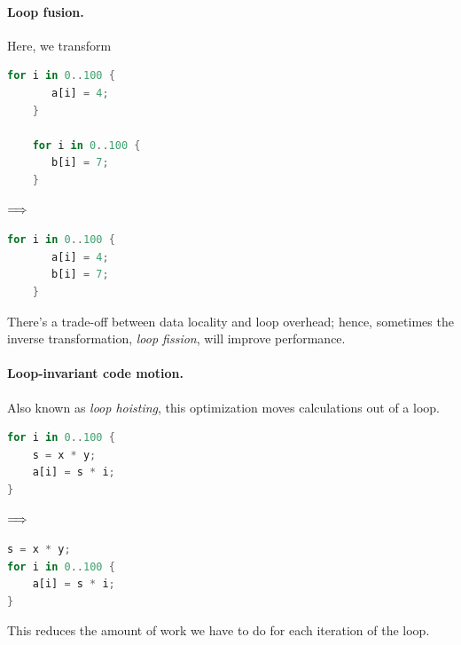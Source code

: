\documentclass[a4paper]{report}
\begin{document}
\paragraph{Loop fusion.} Here, we transform
\begin{center}
\vspace*{-1em}
\begin{minipage}{.3\textwidth}
  \begin{lstlisting}[language=Rust]
    for i in 0..100 {
       a[i] = 4;
    }

    for i in 0..100 {
       b[i] = 7;
    }
  \end{lstlisting}
  \end{minipage} $\Longrightarrow \hspace*{2em}$ \begin{minipage}{.4\textwidth}
  \begin{lstlisting}[language=Rust]
    for i in 0..100 {
       a[i] = 4;
       b[i] = 7;
    }
  \end{lstlisting}
  \end{minipage}
  \end{center}
There's a trade-off between data locality and loop overhead; hence,
sometimes the inverse transformation, \emph{loop fission}, will
improve performance.

\paragraph{Loop-invariant code motion.} Also known as \emph{loop hoisting},
this optimization moves calculations out of a loop. 
\begin{center}
\vspace*{-1em}
\begin{minipage}{.3\textwidth}
  \begin{lstlisting}[language=Rust]
for i in 0..100 {
    s = x * y;
    a[i] = s * i;
}
  \end{lstlisting}
  \end{minipage} $\Longrightarrow \hspace*{2em}$ \begin{minipage}{.4\textwidth}
  \begin{lstlisting}[language=Rust]
s = x * y;
for i in 0..100 {
    a[i] = s * i;
}
  \end{lstlisting}
  \end{minipage}
  \end{center}

This reduces the amount of work we have to do for each iteration of the loop.
\end{document}
